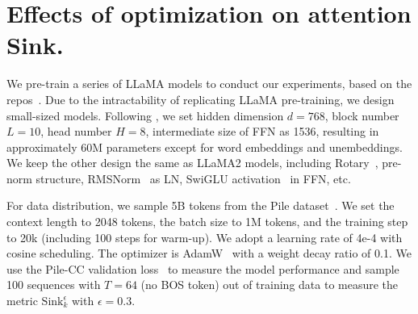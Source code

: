 \documentclass{article} \usepackage{iclr2025_conference,times}
\begin{document}
%
 
\vspace{-0.3cm}
\section{Effects of {\color{cc1}optimization} on attention Sink.}
\vspace{-0.25cm}
\label{sec4}


We pre-train a series of LLaMA models to conduct our experiments, based on the repos~\citep{zhang2024tinyllama,liu2024regmix}. Due to the intractability of replicating LLaMA pre-training, we design small-sized models. Following \citet{liu2024regmix}, we set hidden dimension $d=\textrm{768}$, block number $L=\textrm{10}$, head number $H=\textrm{8}$, intermediate size of FFN as 1536, resulting in approximately 60M parameters except for word embeddings and unembeddings. We keep the other design the same as LLaMA2 models, including Rotary~\citep{su2024roformer}, pre-norm structure, RMSNorm~\citep{zhang2019root} as LN, SwiGLU activation~\citep{shazeer2020glu} in FFN, etc.

For data distribution, we sample 5B tokens from the Pile dataset~\citep{gao2020pile}. We set the context length to 2048 tokens, the batch size to 1M tokens, and the training step to 20k (including 100 steps for warm-up). We adopt a learning rate of 4e-4 with cosine scheduling. The optimizer is AdamW~\citep{loshchilov2017decoupled} with a weight decay ratio of 0.1. We use the Pile-CC validation loss~\citep{gao2020pile,liu2024regmix} to measure the model performance and sample 100 sequences with $T=64$ (no BOS token) out of training data to measure the metric $\textrm{Sink}_k^\epsilon$ with $\epsilon=\textrm{0.3}$.  
\end{document}
